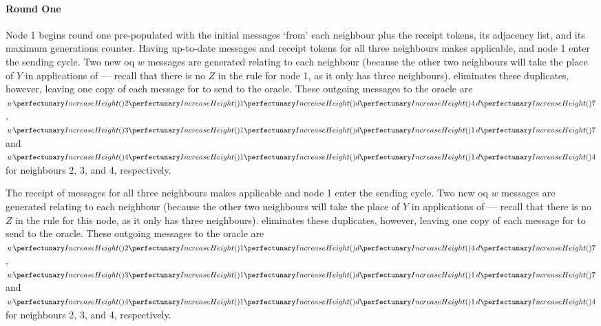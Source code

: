 \paragraph{Round One}
Node 1 begins round one pre-populated with the initial messages `from' each neighbour plus the receipt tokens, its adjacency list, and its maximum generations counter.  Having up-to-date messages and receipt tokens for all three neighbours makes  applicable, and node 1 enter the sending cycle.  Two new \gls{oq} \(w\) messages are generated relating to each neighbour (because the other two neighbours will take the place of \(Y\) in applications of  --- recall that there is no \(Z\) in the rule for node 1, as it only has three neighbours).   eliminates these duplicates, however, leaving one copy of each message for  to send to the oracle.  These outgoing messages to the oracle are \(\cpvw{2}{1}{\cpfunc{d}{4} \, \cpfunc{d}{7}}\), \(\cpvw{3}{1}{\cpfunc{d}{1} \, \cpfunc{d}{7}}\) and \(\cpvw{4}{1}{\cpfunc{d}{1} \, \cpfunc{d}{4}}\) for neighbours 2, 3, and 4, respectively.

The receipt of messages for all three neighbours makes  applicable and node 1 enter the sending cycle.  Two new \gls{oq} \(w\) messages are generated relating to each neighbour (because the other two neighbours will take the place of \(Y\) in applications of  --- recall that there is no \(Z\) in the rule for this node, as it only has three neighbours).   eliminates these duplicates, however, leaving one copy of each message for  to send to the oracle.  These outgoing messages to the oracle are \(\cpvw{2}{1}{\cpfunc{d}{4} \, \cpfunc{d}{7}}\), \(\cpvw{3}{1}{\cpfunc{d}{1} \, \cpfunc{d}{7}}\) and \(\cpvw{4}{1}{\cpfunc{d}{1} \, \cpfunc{d}{4}}\) for neighbours 2, 3, and 4, respectively.

